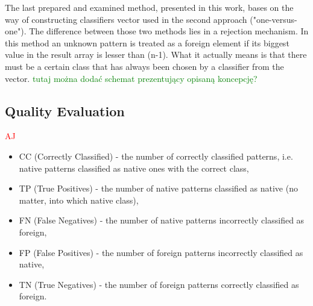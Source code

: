 \documentclass{llncs}
\begin{document}
The last prepared and examined method, presented in this work, bases on the way of constructing classifiers vector used in the second approach ("one-versus-one"). The difference between those two methods lies in a rejection mechanism. In this method an unknown pattern is treated as a foreign element if its biggest value in the result array is lesser than (n-1). What it actually means is that there must be a certain class that has always been chosen by a classifier from the vector. \textcolor{green}{tutaj można dodać schemat prezentujący opisaną koncepcję?} \\




\subsection{Quality Evaluation}
\textcolor{red} {AJ}
\begin{itemize}
\item CC  (Correctly Classified) - the number of correctly classified patterns, i.e. native patterns classified as native ones with the correct class, %
\item TP  (True Positives) - the number of native patterns classified as native (no matter, into which native class),
\item FN  (False Negatives) - the number of native patterns incorrectly classified as foreign,
\item FP  (False Positives) - the number of foreign patterns incorrectly classified as native,
\item TN  (True Negatives) - the number of foreign patterns correctly classified as foreign.
\end{itemize}
\end{document}
